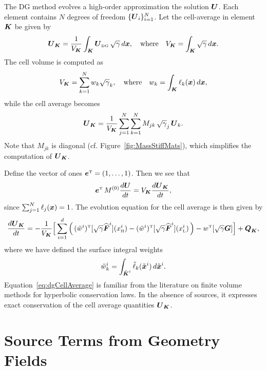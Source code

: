 \documentclass[10pt,preprint]{aastex}
\begin{document}
The DG method evolves a high-order approximation the solution $\boldsymbol{U}$.  
Each element contains $N$ degrees of freedom $\{\boldsymbol{U}_{i}\}_{i=1}^{N}$.  
Let the cell-average in element $\boldsymbol{K}$ be given by
\begin{equation}
  \boldsymbol{U}_{\boldsymbol{K}}=\frac{1}{V_{\boldsymbol{K}}}\int_{\boldsymbol{K}}\boldsymbol{U}_{\mbox{\tiny DG}}\,\sqrt{\gamma}\,d\boldsymbol{x},
  \quad\text{where}\quad
  V_{\boldsymbol{K}}=\int_{\boldsymbol{K}}\sqrt{\gamma}\,d\boldsymbol{x}.  
\end{equation}
The cell volume is computed as
\begin{equation}
  V_{\boldsymbol{K}}=\sum_{k=1}^{N}w_{k}\sqrt{\gamma}_{k},
  \quad\text{where}\quad
  w_{k}=\int_{\boldsymbol{K}}\ell_{k}(\boldsymbol{x})\,d\boldsymbol{x}, 
\end{equation}
while the cell average becomes
\begin{equation}
  \boldsymbol{U}_{\boldsymbol{K}}=\frac{1}{V_{\boldsymbol{K}}}\sum_{j=1}^{N}\sum_{k=1}^{N}M_{jk}\,\sqrt{\gamma}_{j}\,\boldsymbol{U}_{k}.  
\end{equation}
Note that $M_{jk}$ is diagonal (cf. Figure~\ref{fig:MassStiffMats}), which simplifies the computation of $\boldsymbol{U}_{\boldsymbol{K}}$.  

Define the vector of ones $\boldsymbol{e}^{\mbox{\tiny T}}=(1,\ldots,1)$.  
Then we see that
\begin{equation}
  \boldsymbol{e}^{\mbox{\tiny T}}\,M^{(0)}\frac{d \boldsymbol{U}}{d t}=V_{\boldsymbol{K}}\frac{d \boldsymbol{U}_{\boldsymbol{K}}}{d t},
\end{equation}
since $\sum_{j=1}^{N}\ell_{j}(\boldsymbol{x})=1$.  
The evolution equation for the cell average is then given by
\begin{equation}
  \frac{d \boldsymbol{U}_{\boldsymbol{K}}}{d t}
  =-\frac{1}{V_{\boldsymbol{K}}}\Big[\sum_{i=1}^{d}
  \Big(\,
    (\tilde{w}^{i})^{\mbox{\tiny T}}[\sqrt{\gamma}\widehat{\boldsymbol{F}}^{i}](x^{i}_{\mbox{\tiny H}})
    -(\tilde{w}^{i})^{\mbox{\tiny T}}[\sqrt{\gamma}\widehat{\boldsymbol{F}}^{i}](x^{i}_{\mbox{\tiny L}})
  \,\Big)-w^{\mbox{\tiny T}}[\sqrt{\gamma}\boldsymbol{G}]\Big]+\boldsymbol{Q}_{\boldsymbol{K}},
  \label{eq:dgCellAverage}
\end{equation}
where we have defined the surface integral weights
\begin{equation}
  \tilde{w}_{k}^{i}=\int_{\tilde{\boldsymbol{K}}^{i}}\tilde{\ell}_{k}(\tilde{\boldsymbol{x}}^{i})\,d\tilde{\boldsymbol{x}}^{i}.  
\end{equation}
Equation~\eqref{eq:dgCellAverage} is familiar from the literature on finite volume methods for hyperbolic conservation laws.  
In the absence of sources, it expresses exact conservation of the cell average quantities $\boldsymbol{U}_{\boldsymbol{K}}$.  

\section{Source Terms from Geometry Fields}
\end{document}
